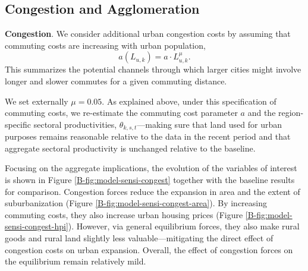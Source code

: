 \documentclass[11pt]{report}
\begin{document}
\subsection{Congestion and Agglomeration}\label{B-sec:agglo}

\textbf{Congestion}. We consider additional urban congestion costs by assuming that commuting costs are increasing with urban population, $$a(L_{u,k})= a\cdot L_{u,k}^{\mu}.$$ This summarizes the potential channels through which larger cities might involve longer and slower commutes for a given commuting distance.  

We set externally $\mu=0.05$. As explained above, under this specification of commuting costs, we re-estimate the commuting cost parameter $a$ and the region-specific sectoral productivities, $\theta_{k,s,t}$---making sure that land used for urban purposes remains reasonable relative to the data in the recent period and that aggregate sectoral productivity is unchanged relative to the baseline. %

Focusing on the aggregate implications, the evolution of the variables of interest is shown in Figure \ref{B-fig:model-sensi-congest} together with the baseline results for comparison. Congestion forces reduce the expansion in area and the extent of suburbanization (Figure \ref{B-fig:model-sensi-congest-area}). By increasing commuting costs, they also increase urban housing prices (Figure \ref{B-fig:model-sensi-congest-hpi}). However, via general equilibrium forces, they also make rural goods and rural land slightly less valuable---mitigating the direct effect of congestion costs on urban expansion. Overall, the effect of congestion forces on the equilibrium remain relatively mild.   
\end{document}
